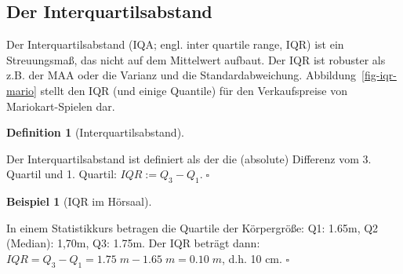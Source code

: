 \documentclass[
  letterpaper,
  twoside,
  open=any]{scrbook}
\theoremstyle{definition}
\theoremstyle{definition}
\newtheorem{example}{Beispiel}[chapter]
\theoremstyle{definition}
\newtheorem{definition}{Definition}[chapter]
\theoremstyle{remark}
\begin{document}
\subsection{Der Interquartilsabstand}\label{der-interquartilsabstand}

Der Interquartilsabstand (IQA; engl. inter quartile range, IQR) ist ein
Streuungsmaß, das nicht auf dem Mittelwert aufbaut. Der IQR ist robuster
als z.B. der MAA oder die Varianz und die Standardabweichung.
Abbildung~\ref{fig-iqr-mario} stellt den IQR (und einige Quantile) für
den Verkaufspreise von Mariokart-Spielen dar.

\begin{definition}[Interquartilsabstand]\protect\hypertarget{def-iqr}{}\label{def-iqr}

Der Interquartilsabstand ist definiert als der die (absolute) Differenz
vom 3. Quartil und 1. Quartil: \(IQR := Q_3-Q_1. \; \square\)

\end{definition}

\begin{example}[IQR im
Hörsaal]\protect\hypertarget{exm-iqr}{}\label{exm-iqr}

In einem Statistikkurs betragen die Quartile der Körpergröße: Q1: 1.65m,
Q2 (Median): 1,70m, Q3: 1.75m. Der IQR beträgt dann:
\(IQR = Q_3-Q_1 = 1.75 \; m - 1.65\;  m = 0.10\; m\), d.h. 10 cm.
\(\square\)

\end{example}
\end{document}
